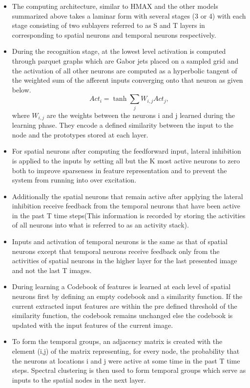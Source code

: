 \documentclass[12pt,twoside]{article}
\theoremstyle{plain}
\theoremstyle{definition}
\theoremstyle{remark}
\begin{document}
\begin{itemize}
\item The computing architecture, similar to HMAX\cite{MaximilianRiesenhuber1999} and the other models summarized above takes a laminar form with several stages (3 or 4) with each stage consisting of two sublayers referred to as S and T layers in \cite{MarkusLessmann2014} corresponding to spatial neurons and temporal neurons respectively.
\item During the recognition stage, at the lowest level activation is computed through parquet graphs\cite{westphal-feat} which are Gabor jets\cite{Gabor1946} placed on a sampled grid  and the activation of all other neurons are computed as a hyperbolic tangent of the weighted sum of the afferent inputs converging onto that neuron\cite{MarkusLessmann2014} as given below. \begin{equation}
Act_i = \tanh\sum\limits_jW_{i,j}Act_j, 
\end{equation} 
where  $W_{i,j}$ are the weights between the neurons i and j learned during the learning phase. They encode a defined similarity between the input to the node and the prototypes stored at each layer.
\item For spatial neurons after computing the feedforward input, lateral inhibition is applied to the inputs by setting all but the K most active neurons to zero both to improve sparseness in feature representation and to prevent the system from running into over excitation.
\item Additionally the spatial neurons that remain active after applying the lateral inhibition receive feedback from the temporal neurons that have been active in the past T time steps(This information is recorded by storing the activities of all neurons into what is referred to as an activity stack\cite{MarkusLessmann2014}).
\item Inputs and activation of temporal neurons is the same as that of spatial neurons except that temporal neurons receive feedback only from the activities of spatial neurons in the higher layer for the last presented image and not the last T images. 
\item During learning a Codebook of features is learned at each level of spatial neurons first by defining an empty codebook and a similarity function. If the current extracted input features are within the pre defined threshold of the similarity function, the codebook remains unchanged else the codebook is updated with the input features of the current image. 
\item To form the temporal groups, an adjacency matrix is created with the element (i,j) of the matrix representing, for every node, the probability that the neurons at locations i and j were active at some time in the past T time steps. Spectral clustering\cite{UlrikevonLuxburg2004} is then used to form temporal groups which serve as inputs to the spatial nodes in the next layer. 

\end{itemize}
\end{document}
